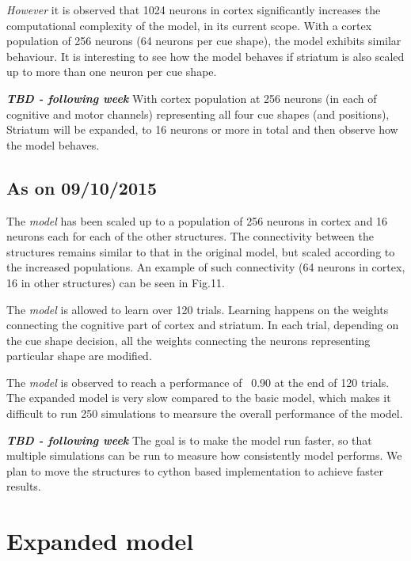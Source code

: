 \documentclass[11pt]{article}
\begin{document}
\par \emph{However} it is observed that 1024 neurons in cortex significantly increases the computational complexity of the model, in its current scope.
With a cortex population of 256 neurons (64 neurons per cue shape), the model exhibits similar behaviour. It is interesting to see how the model behaves if striatum is also scaled up to more than one neuron per cue shape.

\textbf{\emph{TBD - following week}} With cortex population at 256 neurons (in each of cognitive and motor channels) representing all four cue shapes (and positions), Striatum will be expanded, to 16 neurons or more in total and then observe how the model behaves.

\subsection{As on 09/10/2015}
The \emph{model} has been scaled up to a population of 256 neurons in cortex and 16 neurons each for each of the other structures. The connectivity between the structures remains similar to that in the original model, but scaled according to the increased populations. An example of such connectivity (64 neurons in cortex, 16 in other structures) can be seen in Fig.11.
\par
The \emph{model} is allowed to learn over 120 trials. Learning happens on the weights connecting the cognitive part of cortex and striatum. In each trial, depending on the cue shape decision, all the weights connecting the neurons representing particular shape are modified. 
\par
The \emph{model} is observed to reach a performance of ~0.90 at the end of 120 trials. The expanded model is very slow compared to the basic model, which makes it difficult to run 250 simulations to mearsure the overall performance of the model.
  
\textbf{\emph{TBD - following week}} The goal is to make the model run faster, so that multiple simulations can be run to measure how consistently model performs. We plan to move the structures to cython based implementation to achieve faster results. 

\clearpage
\section{Expanded model}
\end{document}
